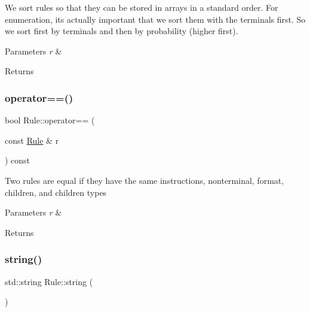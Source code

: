 We sort rules so that they can be stored in arrays in a standard order. For enumeration, it\textquotesingle{}s actually important that we sort them with the terminals first. So we sort first by terminals and then by probability (higher first). 
\begin{DoxyParams}{Parameters}
{\em r} & \\
\hline
\end{DoxyParams}
\begin{DoxyReturn}{Returns}

\end{DoxyReturn}
\mbox{\label{class_rule_a183fafc8a6b43515436a1de8f63ec98d}} 
\subsubsection{\texorpdfstring{operator==()}{operator==()}}
{\footnotesize\ttfamily bool Rule\+::operator== (\begin{DoxyParamCaption}\item[{const \hyperlink{class_rule}{Rule} \&}]{r }\end{DoxyParamCaption}) const\hspace{0.3cm}{\ttfamily [inline]}}

Two rules are equal if they have the same instructions, nonterminal, format, children, and children types 
\begin{DoxyParams}{Parameters}
{\em r} & \\
\hline
\end{DoxyParams}
\begin{DoxyReturn}{Returns}

\end{DoxyReturn}
\mbox{\label{class_rule_a4a75588d7821c1bcf087ec6ebf82bd0f}} 
\subsubsection{\texorpdfstring{string()}{string()}}
{\footnotesize\ttfamily std\+::string Rule\+::string (\begin{DoxyParamCaption}{ }\end{DoxyParamCaption})\hspace{0.3cm}{\ttfamily [inline]}}

\mbox{\label{class_rule_a97db8e22bb8445b92779eb165bb29ae5}} 
